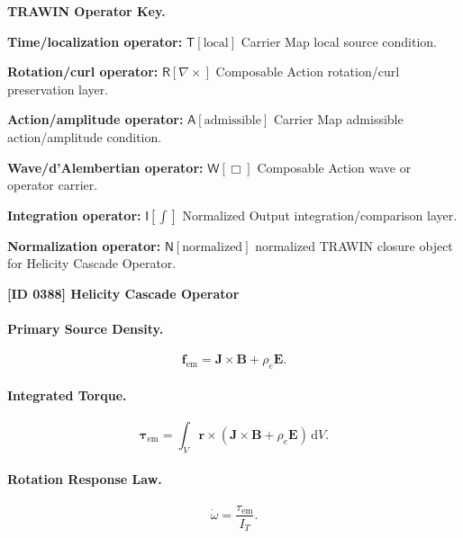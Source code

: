 \par\vspace{0.45\baselineskip}
\noindent\begin{minipage}[t]{\linewidth}
\begingroup
\small
\raggedright
\textbf{TRAWIN Operator Key.}\par
\noindent\textbf{Time/localization operator:} $\mathsf{T}\!\left[\mathrm{local}\right]$ Carrier Map local source condition.\par
\noindent\textbf{Rotation/curl operator:} $\mathsf{R}\!\left[\nabla\times\right]$ Composable Action rotation/curl preservation layer.\par
\noindent\textbf{Action/amplitude operator:} $\mathsf{A}\!\left[\mathrm{admissible}\right]$ Carrier Map admissible action/amplitude condition.\par
\noindent\textbf{Wave/d'Alembertian operator:} $\mathsf{W}\!\left[\Box\right]$ Composable Action wave or operator carrier.\par
\noindent\textbf{Integration operator:} $\mathsf{I}\!\left[\int\right]$ Normalized Output integration/comparison layer.\par
\noindent\textbf{Normalization operator:} $\mathsf{N}\!\left[\mathrm{normalized}\right]$ normalized TRAWIN closure object for Helicity Cascade Operator.\par
\endgroup
\end{minipage}

\clearpage
\noindent\textbf{[ID 0388] Helicity Cascade Operator}\par
\vspace{0.35em}
\paragraph{Primary Source Density.}
\begin{equation}
\mathbf{f}_{\mathrm{em}}
=
\mathbf{J}\times\mathbf{B}
+
\rho_e\mathbf{E}.
\end{equation}

\paragraph{Integrated Torque.}
\begin{equation}
\boldsymbol{\tau}_{\mathrm{em}}
=
\int_V
\mathbf{r}\times
\left(
\mathbf{J}\times\mathbf{B}
+
\rho_e\mathbf{E}
\right)
\,\mathrm{d}V .
\end{equation}

\paragraph{Rotation Response Law.}
\begin{equation}
\dot{\omega}
=
\frac{\tau_{\mathrm{em}}}{I_T}.
\end{equation}

